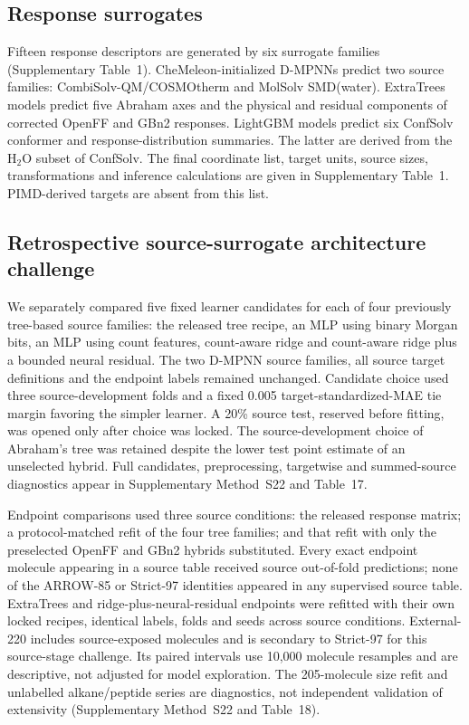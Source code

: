 \documentclass[12pt]{article}
\begin{document}
\subsection*{Response surrogates}

Fifteen response descriptors are generated by six surrogate families (Supplementary
Table~1). CheMeleon-initialized D-MPNNs predict two source families:
CombiSolv-QM/COSMOtherm and MolSolv SMD(water).\cite{chemprop2019,chemeleon2025}
ExtraTrees models predict five Abraham
axes and the physical and residual components of corrected OpenFF and GBn2 responses.
LightGBM models predict six ConfSolv conformer and response-distribution summaries.
The latter are derived from the H$_2$O subset of ConfSolv. The final coordinate list,
target units, source sizes, transformations and inference calculations are given in
Supplementary Table~1. PIMD-derived targets are absent from this list.

\subsection*{Retrospective source-surrogate architecture challenge}

We separately compared five fixed learner candidates for each of four
previously tree-based source families: the released tree recipe, an MLP using
binary Morgan bits, an MLP using count features, count-aware ridge and
count-aware ridge plus a bounded neural residual. The two D-MPNN source
families, all source target definitions and the endpoint labels remained
unchanged. Candidate choice used three source-development folds and a fixed
0.005 target-standardized-MAE tie margin favoring the simpler learner.
A 20\% source test, reserved before fitting, was opened only after choice was
locked. The source-development choice of Abraham's tree was retained despite
the lower test point estimate of an unselected hybrid. Full candidates, preprocessing,
targetwise and summed-source diagnostics appear in Supplementary Method~S22 and
Table~17.

Endpoint comparisons used three source conditions: the released response
matrix; a protocol-matched refit of the four tree families; and that refit with
only the preselected OpenFF and GBn2 hybrids substituted. Every exact endpoint
molecule appearing in a source table received source out-of-fold predictions;
none of the ARROW-85 or Strict-97 identities appeared in any supervised source
table. ExtraTrees and ridge-plus-neural-residual endpoints were refitted with
their own locked recipes, identical labels, folds and seeds across source
conditions. External-220 includes source-exposed molecules and is secondary to
Strict-97 for this source-stage challenge. Its paired intervals use 10,000
molecule resamples and are descriptive, not adjusted for model exploration.
The 205-molecule size refit and unlabelled alkane/peptide series are diagnostics,
not independent validation of extensivity (Supplementary Method~S22 and
Table~18).
\end{document}
